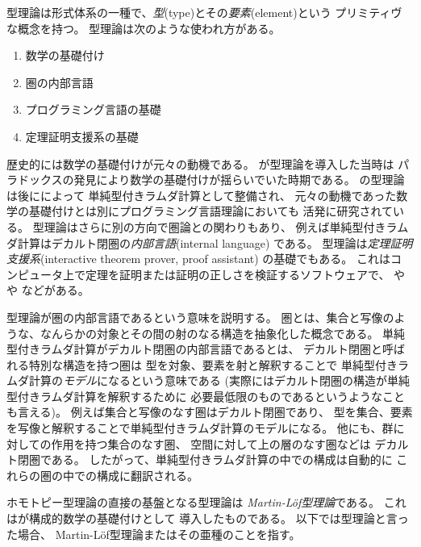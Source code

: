 \documentclass[index]{subfiles}
\begin{document}

型理論は形式体系の一種で、\emph{型}(type)とその\emph{要素}(element)という
プリミティヴな概念を持つ。
型理論は次のような使われ方がある。
\begin{enumerate}
\item 数学の基礎付け
\item 圏の内部言語
\item プログラミング言語の基礎
\item 定理証明支援系の基礎
\end{enumerate}

歴史的には数学の基礎付けが元々の動機である。
が型理論を導入した当時は
パラドックスの発見により数学の基礎付けが揺らいでいた時期である。
の型理論は後にによって
単純型付きラムダ計算として整備され、
元々の動機であった数学の基礎付けとは別にプログラミング言語理論においても
活発に研究されている。
型理論はさらに別の方向で圏論との関わりもあり、
例えば単純型付きラムダ計算はデカルト閉圏の\emph{内部言語}(internal language)
である。
型理論は\emph{定理証明支援系}(interactive theorem prover, proof assistant)
の基礎でもある。
これはコンピュータ上で定理を証明または証明の正しさを検証するソフトウェアで、
や
や
などがある。

型理論が圏の内部言語であるという意味を説明する。
圏とは、集合と写像のような、なんらかの対象とその間の射のなる構造を抽象化した概念である。
単純型付きラムダ計算がデカルト閉圏の内部言語であるとは、
デカルト閉圏と呼ばれる特別な構造を持つ圏は
型を対象、要素を射と解釈することで
単純型付きラムダ計算の\emph{モデル}になるという意味である
(実際にはデカルト閉圏の構造が単純型付きラムダ計算を解釈するために
必要最低限のものであるというようなことも言える)。
例えば集合と写像のなす圏はデカルト閉圏であり、
型を集合、要素を写像と解釈することで単純型付きラムダ計算のモデルになる。
他にも、群に対しての作用を持つ集合のなす圏、
空間に対して上の層のなす圏などは
デカルト閉圏である。
したがって、単純型付きラムダ計算の中での構成は自動的に
これらの圏の中での構成に翻訳される。

ホモトピー型理論の直接の基盤となる型理論は
\emph{Martin-Löf型理論}である。
これはが構成的数学の基礎付けとして
導入したものである。
以下では型理論と言った場合、
Martin-Löf型理論またはその亜種のことを指す。
\end{document}
